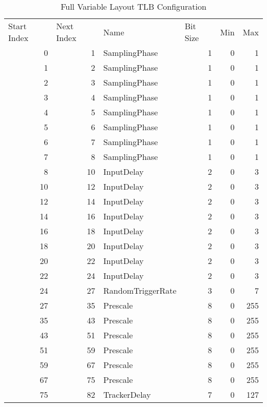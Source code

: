 \begin{table}[htbp]
  \centering
  \caption{Full Variable Layout TLB Configuration}
    \begin{tabular}{rrlrrr}
    \multicolumn{1}{l}{Start Index} & \multicolumn{1}{l}{Next Index} & Name  & \multicolumn{1}{l}{Bit Size} & \multicolumn{1}{l}{Min} & \multicolumn{1}{l}{Max} \\
    0     & 1     & SamplingPhase & 1     & 0     & 1 \\
    1     & 2     & SamplingPhase & 1     & 0     & 1 \\
    2     & 3     & SamplingPhase & 1     & 0     & 1 \\
    3     & 4     & SamplingPhase & 1     & 0     & 1 \\
    4     & 5     & SamplingPhase & 1     & 0     & 1 \\
    5     & 6     & SamplingPhase & 1     & 0     & 1 \\
    6     & 7     & SamplingPhase & 1     & 0     & 1 \\
    7     & 8     & SamplingPhase & 1     & 0     & 1 \\
    8     & 10    & InputDelay & 2     & 0     & 3 \\
    10    & 12    & InputDelay & 2     & 0     & 3 \\
    12    & 14    & InputDelay & 2     & 0     & 3 \\
    14    & 16    & InputDelay & 2     & 0     & 3 \\
    16    & 18    & InputDelay & 2     & 0     & 3 \\
    18    & 20    & InputDelay & 2     & 0     & 3 \\
    20    & 22    & InputDelay & 2     & 0     & 3 \\
    22    & 24    & InputDelay & 2     & 0     & 3 \\
    24    & 27    & RandomTriggerRate & 3     & 0     & 7 \\
    27    & 35    & Prescale & 8     & 0     & 255 \\
    35    & 43    & Prescale & 8     & 0     & 255 \\
    43    & 51    & Prescale & 8     & 0     & 255 \\
    51    & 59    & Prescale & 8     & 0     & 255 \\
    59    & 67    & Prescale & 8     & 0     & 255 \\
    67    & 75    & Prescale & 8     & 0     & 255 \\
    75    & 82    & TrackerDelay & 7     & 0     & 127 \\

\end{tabular}
\end{table}
